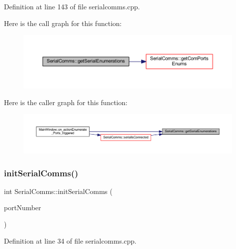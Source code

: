 Definition at line 143 of file serialcomms.\+cpp.

Here is the call graph for this function\+:
\nopagebreak
\begin{figure}[H]
\begin{center}
\leavevmode
\includegraphics[width=350pt]{classSerialComms_ab11ec2f342fc8543e7974a843fad67dd_cgraph}
\end{center}
\end{figure}
Here is the caller graph for this function\+:
\nopagebreak
\begin{figure}[H]
\begin{center}
\leavevmode
\includegraphics[width=350pt]{classSerialComms_ab11ec2f342fc8543e7974a843fad67dd_icgraph}
\end{center}
\end{figure}
\mbox{\label{classSerialComms_aacd1dbe02e7eee87c7d75fc2049e71f4}} 
\subsubsection{\texorpdfstring{initSerialComms()}{initSerialComms()}}
{\footnotesize\ttfamily int Serial\+Comms\+::init\+Serial\+Comms (\begin{DoxyParamCaption}\item[{Q\+String}]{port\+Number }\end{DoxyParamCaption})\hspace{0.3cm}{\ttfamily [private]}}



Definition at line 34 of file serialcomms.\+cpp.

